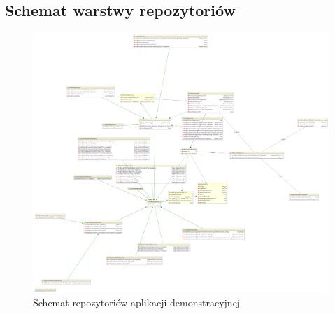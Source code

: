\subsection{Schemat warstwy repozytoriów}
\begin{figure}[H]
	\centering
	\includegraphics[width=\textwidth]{images/springatom_model_repository}
	\caption[Schemat repozytoriów aplikacji demonstracyjnej]{
		Schemat repozytoriów aplikacji demonstracyjnej
	}
	\label{app:schema_org_agatom_springatom_repository}
\end{figure}

